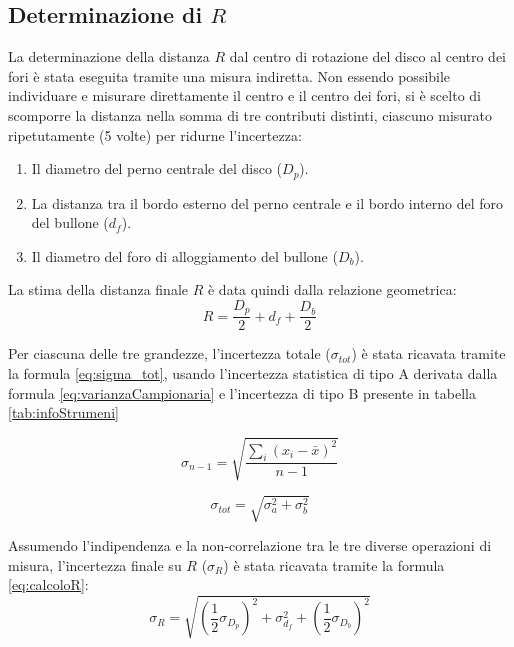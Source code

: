\documentclass{article}
\begin{document}
\subsection{Determinazione di $R$}

La determinazione della distanza $R$ dal centro di rotazione del disco al centro dei fori è stata eseguita tramite una misura indiretta. Non essendo possibile individuare e misurare direttamente il centro e il centro dei fori, si è scelto di scomporre la distanza nella somma di tre contributi distinti, ciascuno misurato ripetutamente (5 volte) per ridurne l'incertezza:
\begin{enumerate}
    \item Il diametro del perno centrale del disco ($D_p$).
    \item La distanza tra il bordo esterno del perno centrale e il bordo interno del foro del bullone ($d_f$).
    \item Il diametro del foro di alloggiamento del bullone ($D_b$).
\end{enumerate}

La stima della distanza finale $R$ è data quindi dalla relazione geometrica:
\begin{equation}
    R = \frac{D_p}{2} + d_f + \frac{D_b}{2}
    \label{eq:calcoloR}
\end{equation}

Per ciascuna delle tre grandezze, l'incertezza totale ($\sigma_{tot}$) è stata ricavata tramite la formula \ref{eq:sigma_tot}, usando l'incertezza statistica di tipo A derivata dalla formula \ref{eq:varianzaCampionaria} e l'incertezza di tipo B presente in tabella \ref{tab:infoStrumeni}

\begin{equation}
    \sigma_{n - 1} = \sqrt{\frac{\sum_i (x_i - \bar{x})^2}{n - 1}}
    \label{eq:varianzaCampionaria}
\end{equation}

\begin{equation}
	\sigma_{tot} = \sqrt{\sigma_a^2 + \sigma_b^2}
	\label{eq:sigma_tot}
\end{equation}

Assumendo l'indipendenza e la non-correlazione tra le tre diverse operazioni di misura, l'incertezza finale su $R$ ($\sigma_R$) è stata ricavata tramite la formula \ref{eq:calcoloR}:
\begin{equation}
    \sigma_R = \sqrt{\left(\frac{1}{2}\sigma_{D_p}\right)^2 + \sigma_{d_f}^2 + \left(\frac{1}{2}\sigma_{D_b}\right)^2}
\end{equation}
\end{document}
